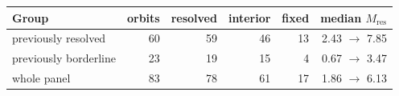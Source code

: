 \begin{tabular}{@{}l r r r r r@{}}
\toprule
Group & orbits & resolved & interior & fixed & median $M_{\mathrm{res}}$ \\
\midrule
previously resolved & 60 & 59 & 46 & 13 & 2.43 $\rightarrow$ 7.85 \\
previously borderline & 23 & 19 & 15 & 4 & 0.67 $\rightarrow$ 3.47 \\
whole panel & 83 & 78 & 61 & 17 & 1.86 $\rightarrow$ 6.13 \\
\bottomrule
\end{tabular}

